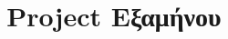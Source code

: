 \documentclass{article}
\title{Project Εξαμήνου}
\begin{document}
\coverpage

\newpage
\tableofcontents
\newpage


%
%
%
%






%
%


\end{document}
